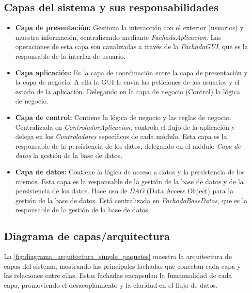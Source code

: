 \documentclass[a4paper,12pt]{article}
\begin{document}
    \subsection{Capas del sistema y sus responsabilidades}\label{subsec:capas-del-sistema}
    \begin{itemize}
        \item \textbf{Capa de presentación:} Gestiona la interacción con el exterior (usuarios) y muestra información, centralizando mediante \textit{FachadaAplicacion}.
        Las operaciones de esta capa son canalizadas a través de la \textit{FachadaGUI}, que es la responsable de la interfaz de usuario.
        \item \textbf{Capa aplicación:} Es la capa de coordinación entre la capa de presentación y la capa de negocio.
        A ella la GUI le envía las peticiones de los usuarios y el estado de la aplicación.
        Delegando en la capa de negocio (Control) la lógica de negocio.
        \item \textbf{Capa de control:} Contiene la lógica de negocio y las reglas de negocio.
        Centralizada en \textit{ControladorAplicacion}, controla el flujo de la aplicación y delega en los \textit{Controladores} específicos de cada módulo.
        Esta capa es la responsable de la persistencia de los datos, delegando en el módulo \textit{Capa de datos} la gestión de la base de datos.
        \item{\textbf{Capa de datos:}} Contiene la lógica de acceso a datos y la persistencia de los mismos.
        Esta capa es la responsable de la gestión de la base de datos y de la persistencia de los datos.
        Hace uso de \textit{DAO} (Data Access Object) para la gestión de la base de datos.
        Está centralizada en \textit{FachadaBaseDatos}, que es la responsable de la gestión de la base de datos.
    \end{itemize}

    \subsection{Diagrama de capas/arquitectura}\label{subsec:diagrama-de-capas}
    La \autoref{fig:diagrama_arquitectura_simple_paquetes} muestra la arquitectura de capas del sistema, mostrando las principales fachadas que conectan cada capa y las relaciones entre ellas.
    Estas fachadas encapsulan la funcionalidad de cada capa, promoviendo el desacoplamiento y la claridad en el flujo de datos.
\end{document}
